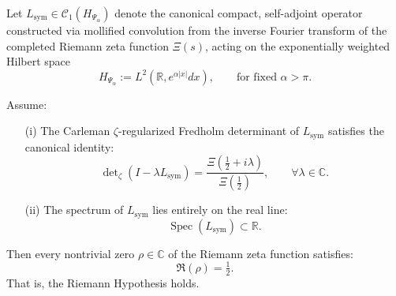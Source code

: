 \begin{lemma}
\label{lem:real_spectrum_implies_rh}
Let \( L_{\mathrm{sym}} \in \mathcal{C}_1(H_{\Psi_\alpha}) \) denote the canonical compact, self-adjoint operator constructed via mollified convolution from the inverse Fourier transform of the completed Riemann zeta function \( \Xi(s) \), acting on the exponentially weighted Hilbert space
\[
H_{\Psi_\alpha} := L^2(\mathbb{R}, e^{\alpha |x|} dx), \qquad \text{for fixed } \alpha > \pi.
\]

Assume:
\begin{enumerate}
  \item[\textnormal{(i)}] The Carleman \(\zeta\)-regularized Fredholm determinant of \( L_{\mathrm{sym}} \) satisfies the canonical identity:
  \[
  \det\nolimits_{\zeta}(I - \lambda L_{\mathrm{sym}}) = \frac{\Xi\left(\tfrac{1}{2} + i\lambda\right)}{\Xi\left(\tfrac{1}{2}\right)}, \qquad \forall \lambda \in \mathbb{C}.
  \]

  \item[\textnormal{(ii)}] The spectrum of \( L_{\mathrm{sym}} \) lies entirely on the real line:
  \[
  \operatorname{Spec}(L_{\mathrm{sym}}) \subset \mathbb{R}.
  \]
\end{enumerate}

Then every nontrivial zero \( \rho \in \mathbb{C} \) of the Riemann zeta function satisfies:
\[
\Re(\rho) = \tfrac{1}{2}.
\]
That is, the Riemann Hypothesis holds.
\end{lemma}
